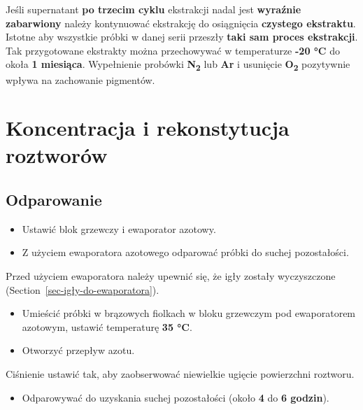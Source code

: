 \documentclass[
  letterpaper,
  DIV=11,
  numbers=noendperiod]{scrreprt}
\providecommand{\tightlist}{%
  \setlength{\itemsep}{0pt}\setlength{\parskip}{0pt}}\usepackage{longtable,booktabs,array}
\begin{document}
\begin{itemize}
  Jeśli supernatant \textbf{po trzecim cyklu} ekstrakcji nadal jest
  \textbf{wyraźnie zabarwiony} należy kontynuować ekstrakcję do
  osiągnięcia \textbf{czystego ekstraktu}.\\
  Istotne aby wszystkie próbki w danej serii przeszły \textbf{taki sam
  proces ekstrakcji}.\\
  Tak przygotowane ekstrakty można przechowywać w temperaturze
  \textbf{-20 °C} do okoła \textbf{1 miesiąca}. Wypełnienie probówki
  \textbf{N\textsubscript{2}} lub \textbf{Ar} i usunięcie
  \textbf{O\textsubscript{2}} pozytywnie wpływa na zachowanie pigmentów.
\end{itemize}

\hypertarget{koncentracja-i-rekonstytucja-roztworuxf3w}{%
\section{Koncentracja i rekonstytucja
roztworów}\label{koncentracja-i-rekonstytucja-roztworuxf3w}}

\hypertarget{odparowanie}{%
\subsection{Odparowanie}\label{odparowanie}}

\begin{itemize}
\item
  Ustawić blok grzewczy i ewaporator azotowy.
\item
  Z użyciem ewaporatora azotowego odparować próbki do suchej
  pozostałości.
\end{itemize}

Przed użyciem ewaporatora należy upewnić się, że igły zostały
wyczyszczone (Section~\ref{sec-igły-do-ewaporatora}).

\begin{itemize}
\item
  Umieścić próbki w brązowych fiolkach w bloku grzewczym pod
  ewaporatorem azotowym, ustawić temperaturę \textbf{35 °C}.
\item
  Otworzyć przepływ azotu.
\end{itemize}

Ciśnienie ustawić tak, aby zaobserwować niewielkie ugięcie powierzchni
roztworu.

\begin{itemize}
\tightlist
\item
  Odparowywać do uzyskania suchej pozostałości (około \textbf{4} do
  \textbf{6 godzin}).
\end{itemize}
\end{document}
